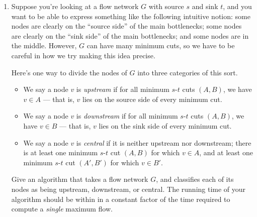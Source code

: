 \documentclass[12pt]{article}
\begin{document}
\begin{enumerate}
{}



\item 

Suppose you're looking at a flow network $G$
with source $s$ and sink $t$, and
you want to be able to express something like the following
intuitive notion: some nodes are clearly on the ``source side''
of the main bottlenecks; some nodes are clearly on the ``sink side''
of the main bottlenecks; and some nodes are in the middle.
However, $G$ can have many minimum cuts, so we have
to be careful in how we try making this idea precise.

Here's one way to divide the nodes of $G$ into three
categories of this sort.
\begin{itemize}
\item We say a node $v$ is
{\em upstream} if for all minimum $s$-$t$ cuts $(A,B)$, we have
$v \in A$ --- that is, $v$ lies on the source side of every minimum cut.
\item We say a node $v$ is
{\em downstream} if for all minimum $s$-$t$ cuts $(A,B)$, we have
$v \in B$ --- that is, $v$ lies on the sink side of every minimum cut.
\item We say a node $v$ is
{\em central} if it is neither upstream nor downstream;
there is at least one minimum $s$-$t$ cut $(A,B)$ for which $v \in A$,
and at least one minimum $s$-$t$ cut $(A',B')$ for which $v \in B'$.
\end{itemize}

Give an algorithm that takes a flow network $G$, and
classifies each of its nodes as being upstream, downstream, or central.
The running time of your algorithm should be within in a constant
factor of the time required to compute a {\em single} maximum flow.

\end{enumerate}
\end{document}
